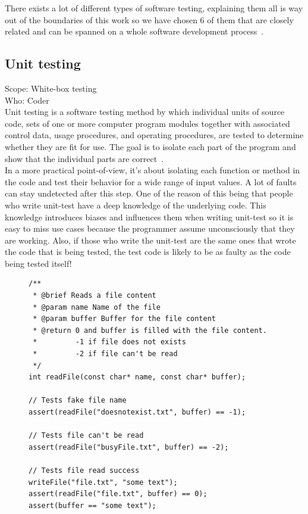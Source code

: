 \documentclass[12pt]{article}
\theoremstyle{definition}
\theoremstyle{definition}
\theoremstyle{remark}
\begin{document}

There exists a lot of different types of software testing, explaining them all is way out of the boundaries of this work so we have chosen 6 of them that are closely related and can be spanned on a whole software development process~\cite{Laurie.W:Black-box}.


\subsection{Unit testing}

Scope: White-box testing\\
Who: Coder\\

Unit testing is a software testing method by which individual units of source code, sets of one or more computer program modules together with associated control data, usage procedures, and operating procedures, are tested to determine whether they are fit for use. The goal is to isolate each part of the program and show that the individual parts are correct~\cite{AutomatedDefectPrevention:2007}.\\

In a more practical point-of-view, it's about isolating each function or method in the code and test their behavior for a wide range of input values. A lot of faults can stay undetected after this step. One of the reason of this being that people who write unit-test have a deep knowledge of the underlying code. This knowledge introduces biases and influences them when writing unit-test so it is easy to miss use cases because the programmer assume unconsciously that they are working. Also, if those who write the unit-test are the same ones that wrote the code that is being tested, the test code is likely to be as faulty as the code being tested itself!

\begin{figure}
\label{unit_testing_sample}
\begin{lstlisting}[caption=Brief example of what unit testing is (C pseudocode),label={lst:unit_testing_sample}]
/**
 * @brief Reads a file content
 * @param name Name of the file
 * @param buffer Buffer for the file content
 * @return 0 and buffer is filled with the file content.
 *         -1 if file does not exists
 *         -2 if file can't be read
 */
int readFile(const char* name, const char* buffer);

// Tests fake file name
assert(readFile("doesnotexist.txt", buffer) == -1);

// Tests file can't be read
assert(readFile("busyFile.txt", buffer) == -2);

// Tests file read success
writeFile("file.txt", "some text");
assert(readFile("file.txt", buffer) == 0);
assert(buffer == "some text");
\end{lstlisting}
\end{figure}
\end{document}
